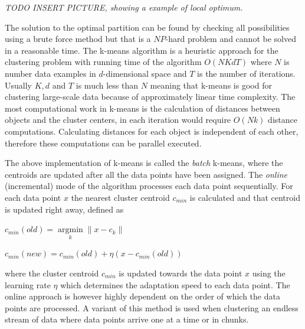 \textit{TODO INSERT PICTURE, showing a example of local optimum.}

The solution to the optimal partition can be found by checking all possibilities using a brute force method but that is a $NP$-hard problem \cite{Aloise:2009KmeansNPHard} and cannot be solved in a reasonable time. The k-means algorithm is a heuristic approach for the clustering problem with running time of the algorithm $O(NKdT)$ where $N$ is number data examples in $d$-dimensional space and $T$ is the number of iterations. Usually $K,d$ and $T$ is much less than $N$ meaning that k-means is good for clustering large-scale data because of approximately linear time complexity. The most computational work in k-means is the calculation of distances between objects and the cluster centers, in each iteration would require $O(Nk)$ distance computations. Calculating distances for each object is independent of each other, therefore these computations can be parallel executed.

The above implementation of k-means is called the \textit{batch} k-means, where the centroids are updated after all the data points have been assigned. The \textit{online} (incremental) mode of the algorithm processes each data point sequentially. For each data point $x$ the nearest cluster centroid $c_{min}$ is calculated and that centroid is updated right away, defined as 

\begin{center}
$c_{min}(old) = \underset{k}{\operatorname{argmin}} \|x-c_k\|$

$c_{min}(new) = c_{min}(old)+\eta(x-c_{min}(old))$
\end{center}

where the cluster centroid $c_{min}$ is updated towards the data point $x$ using the learning rate $\eta$ which determines the adaptation speed to each data point. The online approach is however highly dependent on the order of which the data points are processed. A variant of this method is used when clustering an endless stream of data where data points arrive one at a time or in chunks.


